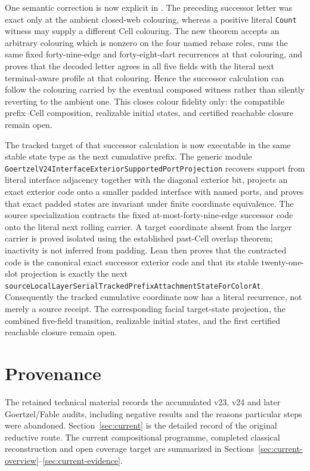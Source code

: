 \documentclass[11pt]{article}
\theoremstyle{definition}
\begin{document}
One semantic correction is now explicit in
.
The preceding successor letter was exact only at the ambient closed-web
colouring, whereas a positive literal \texttt{Count} witness may supply a
different Cell colouring.  The new theorem accepts an arbitrary colouring
which is nonzero on the four named rebase roles, runs the same fixed
forty-nine-edge and forty-eight-dart recurrences at that colouring, and proves
that the decoded letter agrees in all five fields with the literal next
terminal-aware profile at that colouring.  Hence the successor calculation can
follow the colouring carried by the eventual composed witness rather than
silently reverting to the ambient one.  This closes colour fidelity only: the
compatible prefix--Cell composition, realizable initial states, and certified
reachable closure remain open.

The tracked target of that successor calculation is now executable in the
same stable state type as the next cumulative prefix.  The generic module
\texttt{GoertzelV24InterfaceExteriorSupportedPortProjection} recovers support
from literal interface adjacency together with the diagonal exterior bit,
projects an exact exterior code onto a smaller padded interface with named
ports, and proves that exact padded states are invariant under finite
coordinate equivalence.  The source specialization
contracts the fixed at-most-forty-nine-edge successor code onto the literal
next rolling carrier.  A target coordinate absent from the larger carrier is
proved isolated using the established past-Cell overlap theorem; inactivity is
not inferred from padding.  Lean then proves that the contracted code is the
canonical exact successor exterior code and that its stable twenty-one-slot
projection is exactly the next
\texttt{sourceLocalLayerSerialTrackedPrefixAttachmentStateForColorAt}.
Consequently the tracked cumulative coordinate now has a literal recurrence,
not merely a source receipt.  The corresponding facial target-state
projection, the combined five-field transition, realizable initial states,
and the first certified reachable closure remain open.

\section*{Provenance}
The retained technical material records the accumulated v23, v24 and later
Goertzel/Fable audits, including negative results and the reasons particular
steps were abandoned. Section~\ref{sec:current} is the detailed record of the
original reductive route. The current compositional programme, completed
classical reconstruction and open coverage target are summarized in
Sections~\ref{sec:current-overview}--\ref{sec:current-evidence}.
\end{document}
